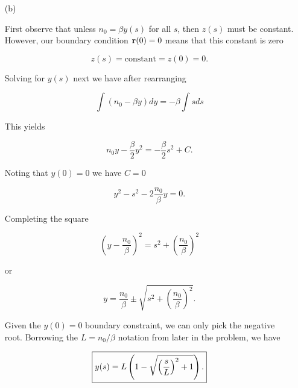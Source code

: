 {\begin{enumerate}
We have two non-trivial differential equations to solve.

\item[(b)]

First observe that unless $n_0 = \beta y(s)$ for all $s$, then $z(s)$ must be constant.  However, our boundary condition $\mathbf{r}(0) = 0$ means that this constant is zero

\begin{equation}\label{eqn:modernOpticsProblemSet1P2:110}
z(s) = \text{constant} = z(0) = 0.
\end{equation}

Solving for $y(s)$ next we have after rearranging

\begin{dmath}\label{eqn:modernOpticsProblemSet1P2:130}
\int \left( n_0 - \beta y \right) dy = -\beta \int s ds
\end{dmath}

This yields

\begin{dmath}\label{eqn:modernOpticsProblemSet1P2:150}
n_0 y - \frac{\beta}{2} y^2 = -\frac{\beta}{2} s^2 + C.
\end{dmath}

Noting that $y(0) = 0$ we have $C = 0$

\begin{dmath}\label{eqn:modernOpticsProblemSet1P2:170}
y^2 - s^2 - 2 \frac{n_0}{\beta} y = 0.
\end{dmath}

Completing the square

\begin{dmath}\label{eqn:modernOpticsProblemSet1P2:230}
\left( y - \frac{n_0}{\beta} \right)^2 = s^2 + \left( \frac{n_0}{\beta} \right)^2
\end{dmath}

or

\begin{dmath}\label{eqn:modernOpticsProblemSet1P2:190}
y = \frac{n_0}{\beta} \pm \sqrt{ s^2 + \left( \frac{n_0}{\beta} \right)^2 }.
\end{dmath}

Given the $y(0) = 0$ boundary constraint, we can only pick the negative root.  Borrowing the $L = n_0/\beta$ notation from later in the problem, we have

\begin{dmath}\label{eqn:modernOpticsProblemSet1P2:210}
\boxed{
y(s) = L \left( 1 - \sqrt{ \left( \frac{s}{L}\right)^2 + 1 } \right) .
}
\end{dmath}


\end{enumerate}}
